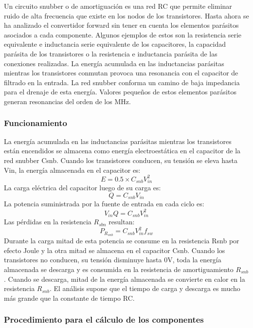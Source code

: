 Un circuito snubber o de amortiguación es una red RC que permite eliminar ruido de alta frecuencia que existe en los nodos de los transistores.
Hasta ahora se ha analizado el convertidor forward sin tener en cuenta los elementos parásitos asociados a cada componente. 
Algunos ejemplos de estos son la resistencia serie equivalente e inductancia serie equivalente de los capacitores, 
la capacidad parásita de los transistores o la resistencia e inductancia parásita de las conexiones realizadas. 
La energía acumulada en las inductancias parásitas mientras los transistores conmutan provoca una resonancia con el capacitor de filtrado en la entrada. 
La red snubber conforma un camino de baja impedancia para el drenaje de esta energía. 
Valores pequeños de estos elementos parásitos generan resonancias del orden de los MHz. 

\subsubsection{Funcionamiento}

La energía acumulada en las inductancias parásitas mientras los transistores están encendidos se almacena como energía electroestática en el capacitor de la red snubber Csnb. 
Cuando los transistores conducen, su tensión se eleva hasta Vin, la energía almacenada en el capacitor es: 
$$ E=0.5\times C_{snb}V_{in}^{2} $$
La carga eléctrica del capacitor luego de su carga es:
$$ Q=C_{snb}V_{in} $$
La potencia suministrada por la fuente de entrada en cada ciclo es:
$$ V_{in}Q=C_{snb}V_{in}^{2} $$
Las pérdidas en la resistencia $R_{sbn}$ resultan:
$$ P_{R_{snb}}=C_{snb}V_{in}^{2}f_{sw} $$
Durante la carga mitad de esta potencia se consume en la resistencia Rsnb por efecto Joule y la otra mitad se almacena en el capacitor Csnb. 
Cuando los transistores no conducen, su tensión disminuye hasta 0V, toda la energía almacenada se descarga y es consumida en la resistencia de amortiguamiento $R_{snb}$.
Cuando se descarga, mitad de la energía almacenada se convierte en calor en la resistencia $R_{snb}$. 
El análisis supone que el tiempo de carga y descarga es mucho más grande que la constante de tiempo RC. 

\subsubsection{Procedimiento para el cálculo de los componentes}

